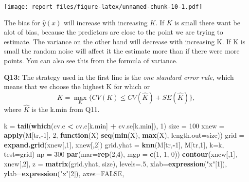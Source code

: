 \documentclass[]{article}
\newenvironment{Shaded}{\begin{snugshade}}{\end{snugshade}}
\newcommand{\KeywordTok}[1]{\textcolor[rgb]{0.13,0.29,0.53}{\textbf{#1}}}
\newcommand{\DataTypeTok}[1]{\textcolor[rgb]{0.13,0.29,0.53}{#1}}
\newcommand{\DecValTok}[1]{\textcolor[rgb]{0.00,0.00,0.81}{#1}}
\newcommand{\StringTok}[1]{\textcolor[rgb]{0.31,0.60,0.02}{#1}}
\newcommand{\OtherTok}[1]{\textcolor[rgb]{0.56,0.35,0.01}{#1}}
\newcommand{\ControlFlowTok}[1]{\textcolor[rgb]{0.13,0.29,0.53}{\textbf{#1}}}
\newcommand{\OperatorTok}[1]{\textcolor[rgb]{0.81,0.36,0.00}{\textbf{#1}}}
\newcommand{\NormalTok}[1]{#1}
\begin{document}
\texttt{[image: report\_files/figure-latex/unnamed-chunk-10-1.pdf]}

The bias for \(\hat{y}(x)\) will increase with increasing \(K\). If
\(K\) is small there want be alot of bias, because the predictors are
close to the point we are trying to estimate. The variance on the other
hand will decrease with increasing K. If K is small the random noise
will affect it the estimate more than if there were more points. You can
also see this from the formula of variance.

\textbf{Q13:} The strategy used in the first line is the
\textit{one standard error rule}, which means that we choose the highest
K for which or
\[K = \max\limits_K\{CV(K) \leq CV(\hat{K}) + SE(\hat{K})\},\] where
\(\hat{K}\) is the k.min from Q11.

\begin{Shaded}
\begin{Highlighting}[]
\NormalTok{k =}\StringTok{ }\KeywordTok{tail}\NormalTok{(}\KeywordTok{which}\NormalTok{(cv.e }\OperatorTok{<}\StringTok{ }\NormalTok{cv.e[k.min] }\OperatorTok{+}\StringTok{ }\NormalTok{cv.se[k.min]), }\DecValTok{1}\NormalTok{)}
\NormalTok{size =}\StringTok{ }\DecValTok{100}
\NormalTok{xnew =}\StringTok{ }\KeywordTok{apply}\NormalTok{(M[tr,}\OperatorTok{-}\DecValTok{1}\NormalTok{], }\DecValTok{2}\NormalTok{, }\ControlFlowTok{function}\NormalTok{(X) }\KeywordTok{seq}\NormalTok{(}\KeywordTok{min}\NormalTok{(X), }\KeywordTok{max}\NormalTok{(X), }\DataTypeTok{length.out=}\NormalTok{size))}
\NormalTok{grid =}\StringTok{ }\KeywordTok{expand.grid}\NormalTok{(xnew[,}\DecValTok{1}\NormalTok{], xnew[,}\DecValTok{2}\NormalTok{])}
\NormalTok{grid.yhat =}\StringTok{ }\KeywordTok{knn}\NormalTok{(M[tr,}\OperatorTok{-}\DecValTok{1}\NormalTok{], M[tr,}\DecValTok{1}\NormalTok{], }\DataTypeTok{k=}\NormalTok{k, }\DataTypeTok{test=}\NormalTok{grid)}
\NormalTok{np =}\StringTok{ }\DecValTok{300}
\KeywordTok{par}\NormalTok{(}\DataTypeTok{mar=}\KeywordTok{rep}\NormalTok{(}\DecValTok{2}\NormalTok{,}\DecValTok{4}\NormalTok{), }\DataTypeTok{mgp =} \KeywordTok{c}\NormalTok{(}\DecValTok{1}\NormalTok{, }\DecValTok{1}\NormalTok{, }\DecValTok{0}\NormalTok{))}
\KeywordTok{contour}\NormalTok{(xnew[,}\DecValTok{1}\NormalTok{], xnew[,}\DecValTok{2}\NormalTok{], }\DataTypeTok{z =} \KeywordTok{matrix}\NormalTok{(grid.yhat, size), }\DataTypeTok{levels=}\NormalTok{.}\DecValTok{5}\NormalTok{, }
        \DataTypeTok{xlab=}\KeywordTok{expression}\NormalTok{(}\StringTok{"x"}\NormalTok{[}\DecValTok{1}\NormalTok{]), }\DataTypeTok{ylab=}\KeywordTok{expression}\NormalTok{(}\StringTok{"x"}\NormalTok{[}\DecValTok{2}\NormalTok{]), }\DataTypeTok{axes=}\OtherTok{FALSE}\NormalTok{,}

\end{Highlighting}
\end{Shaded}
\end{document}
